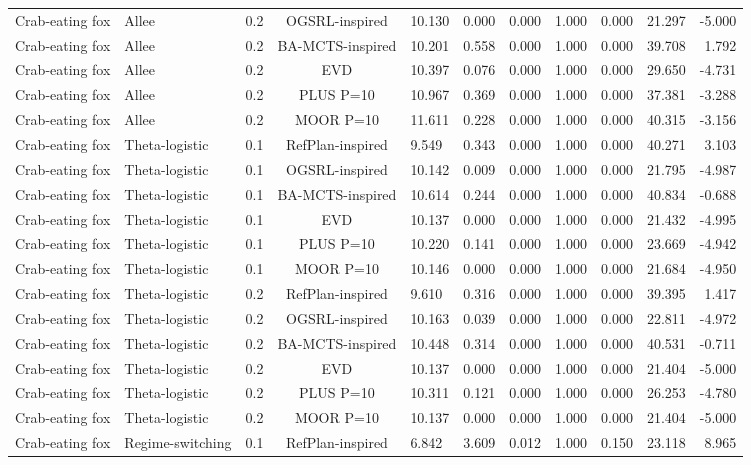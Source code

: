 \documentclass[10pt]{article}
\begin{document}
\begin{landscape}
\begin{center}
\begin{longtable}{@{}lllclrrrrrr@{}}
Crab-eating fox & Allee & 0.2 & OGSRL-inspired & 10.130 & 0.000 & 0.000 & 1.000 & 0.000 & 21.297 & -5.000 \\
Crab-eating fox & Allee & 0.2 & BA-MCTS-inspired & 10.201 & 0.558 & 0.000 & 1.000 & 0.000 & 39.708 & 1.792 \\
Crab-eating fox & Allee & 0.2 & EVD & 10.397 & 0.076 & 0.000 & 1.000 & 0.000 & 29.650 & -4.731 \\
Crab-eating fox & Allee & 0.2 & PLUS P=10 & 10.967 & 0.369 & 0.000 & 1.000 & 0.000 & 37.381 & -3.288 \\
Crab-eating fox & Allee & 0.2 & MOOR P=10 & 11.611 & 0.228 & 0.000 & 1.000 & 0.000 & 40.315 & -3.156 \\
Crab-eating fox & Theta-logistic & 0.1 & RefPlan-inspired & 9.549 & 0.343 & 0.000 & 1.000 & 0.000 & 40.271 & 3.103 \\
Crab-eating fox & Theta-logistic & 0.1 & OGSRL-inspired & 10.142 & 0.009 & 0.000 & 1.000 & 0.000 & 21.795 & -4.987 \\
Crab-eating fox & Theta-logistic & 0.1 & BA-MCTS-inspired & 10.614 & 0.244 & 0.000 & 1.000 & 0.000 & 40.834 & -0.688 \\
Crab-eating fox & Theta-logistic & 0.1 & EVD & 10.137 & 0.000 & 0.000 & 1.000 & 0.000 & 21.432 & -4.995 \\
Crab-eating fox & Theta-logistic & 0.1 & PLUS P=10 & 10.220 & 0.141 & 0.000 & 1.000 & 0.000 & 23.669 & -4.942 \\
Crab-eating fox & Theta-logistic & 0.1 & MOOR P=10 & 10.146 & 0.000 & 0.000 & 1.000 & 0.000 & 21.684 & -4.950 \\
Crab-eating fox & Theta-logistic & 0.2 & RefPlan-inspired & 9.610 & 0.316 & 0.000 & 1.000 & 0.000 & 39.395 & 1.417 \\
Crab-eating fox & Theta-logistic & 0.2 & OGSRL-inspired & 10.163 & 0.039 & 0.000 & 1.000 & 0.000 & 22.811 & -4.972 \\
Crab-eating fox & Theta-logistic & 0.2 & BA-MCTS-inspired & 10.448 & 0.314 & 0.000 & 1.000 & 0.000 & 40.531 & -0.711 \\
Crab-eating fox & Theta-logistic & 0.2 & EVD & 10.137 & 0.000 & 0.000 & 1.000 & 0.000 & 21.404 & -5.000 \\
Crab-eating fox & Theta-logistic & 0.2 & PLUS P=10 & 10.311 & 0.121 & 0.000 & 1.000 & 0.000 & 26.253 & -4.780 \\
Crab-eating fox & Theta-logistic & 0.2 & MOOR P=10 & 10.137 & 0.000 & 0.000 & 1.000 & 0.000 & 21.404 & -5.000 \\
Crab-eating fox & Regime-switching & 0.1 & RefPlan-inspired & 6.842 & 3.609 & 0.012 & 1.000 & 0.150 & 23.118 & 8.965 \\

\end{longtable}
\end{center}
\end{landscape}
\end{document}
